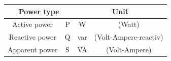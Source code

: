 \begin{frame}
{        \begin{table}[H]
            \centering
                \begin{tabular}{  c  c  c  c }
                    \hline
                    \multicolumn{2}{c}{\bf Power type} & \multicolumn{2}{c}{\bf Unit} \\
                    \hline
                    Active power & P & W & (Watt) \\
                    Reactive power & Q & var & (Volt-Ampere-reactiv) \\
                    Apparent power & S  & VA & (Volt-Ampere) \\
                    \hline
                \end{tabular}
        \end{table}
    }
\end{frame}


